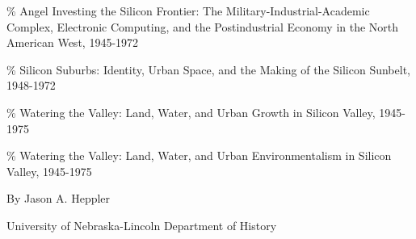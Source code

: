\documentclass[11pt,article,oneside]{memoir}
\author{\bigskip\Large }
\begin{document}
  

\setsansfont[Mapping=tex-text, BoldFont={* Bold SemiCondensed}, ItalicFont={* Semibold SemiCondensed Italic}]{Myriad Pro}
\setmonofont[Mapping=tex-text,Scale=MatchLowercase]{Consolas}


\setsansfont[Mapping=tex-text]{Minion Pro} 
\setmonofont[Mapping=tex-text,Scale=0.8]{Consolas}
\pagestyle{kjh}




\% Angel Investing the Silicon Frontier: The
Military-Industrial-Academic Complex, Electronic Computing, and the
Postindustrial Economy in the North American West, 1945-1972

\% Silicon Suburbs: Identity, Urban Space, and the Making of the Silicon
Sunbelt, 1948-1972

\% Watering the Valley: Land, Water, and Urban Growth in Silicon Valley,
1945-1975

\% Watering the Valley: Land, Water, and Urban Environmentalism in
Silicon Valley, 1945-1975

By Jason A. Heppler

University of Nebraska-Lincoln Department of History
\end{document}
